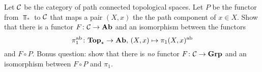 \begin{exercise}
Let ${\mathcal{C}}$ be the category of path connected topological spaces. Let $P$ be the functor
from $\Top_\ast$ to ${\mathcal{C}}$ that maps a pair $(X,x)$ the the path component of $x\in X$.
Show that there is a functor $F\colon {\mathcal{C}} \to \mathbf{Ab}$
and an isomorphism between the functors
\[
	\pi_1^{\mathrm{ab}} \colon \mathbf{Top}_\star \to \mathbf{Ab},\, (X,x) \mapsto \pi_1(X,x)^{\mathrm{ab}}
\]
and $F\circ P$. Bonus question: show that there is \emph{no} functor $F\colon {\mathcal{C}} \to \mathbf{Grp}$ and 
an isomorphism between $F\circ P$ and $\pi_1$.
\end{exercise}







